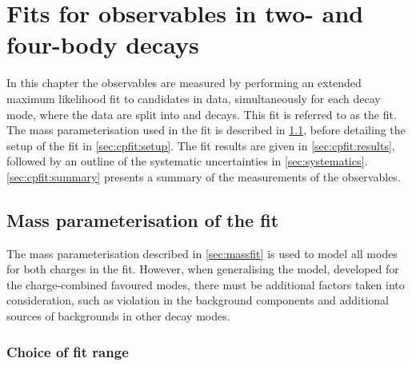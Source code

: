 \clearpage
%

\chapter{\label{ch:5-cpfit}Fits for \CP observables in two- and four-body decays} 


In this chapter the \CP observables are measured by performing an extended maximum likelihood fit to \btodkst candidates in data, simultaneously for each \Dz decay mode, where the data are split into \Bp and \Bm decays. This fit is referred to as the \CP fit. The mass parameterisation used in the \CP fit is described in \sect\ref{sec:cpfit:model}, before detailing the setup of the \CP fit in \sect\ref{sec:cpfit:setup}. The \CP fit results are given in \sect\ref{sec:cpfit:results}, followed by an outline of the systematic uncertainties in \sect\ref{sec:systematics}. \Sect\ref{sec:cpfit:summary} presents a summary of the measurements of the \CP observables.

\section{Mass parameterisation of the \CP fit}
\label{sec:cpfit:model}

The mass parameterisation described in \sect\ref{sec:massfit} is used to model all \Dz modes for both \B charges in the \CP fit. However, when generalising the model, developed for the charge-combined favoured modes, there must be additional factors taken into consideration, such as \CP violation in the background components and additional sources of backgrounds in other \Dz decay modes.

\subsection{Choice of fit range}
\label{sec:cpfit:range}	


